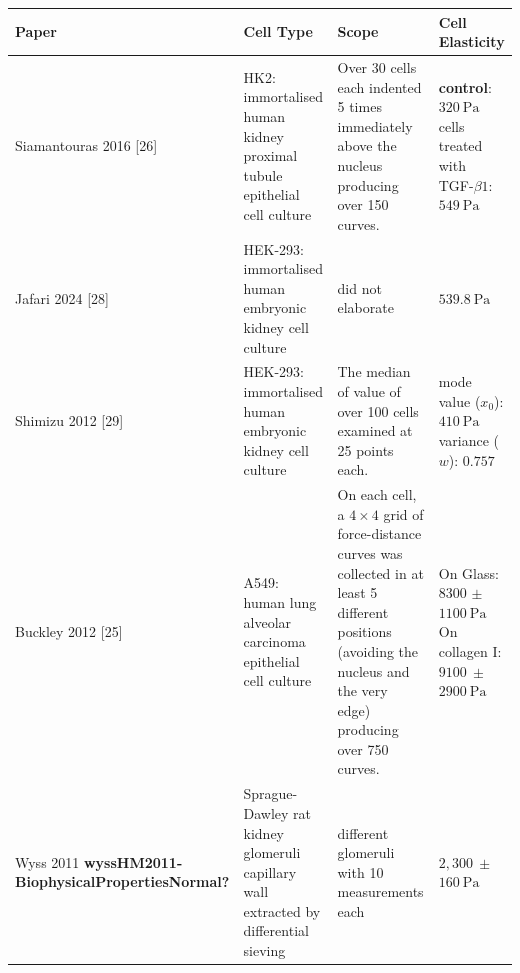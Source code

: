 \documentclass[
  paper=a4,
  ,captions=tableheading
]{scrartcl}
\begin{document}
\begin{longtable}[]{@{}
  >{\raggedright\arraybackslash}p{}
  >{\raggedright\arraybackslash}p{}
  >{\raggedright\arraybackslash}p{}
  >{\raggedright\arraybackslash}p{}@{}}
\toprule\noalign{}
\begin{minipage}[b]{\linewidth}\raggedright
Paper
\end{minipage} & \begin{minipage}[b]{\linewidth}\raggedright
Cell Type
\end{minipage} & \begin{minipage}[b]{\linewidth}\raggedright
Scope
\end{minipage} & \begin{minipage}[b]{\linewidth}\raggedright
Cell Elasticity
\end{minipage} \\
\midrule\noalign{}
\endhead
\bottomrule\noalign{}
\endlastfoot
Siamantouras 2016 {[}26{]} & HK2: immortalised human kidney proximal
tubule epithelial cell culture & Over 30 cells each indented 5 times
immediately above the nucleus producing over 150 curves. &
\textbf{control}: \(320 \ \text{Pa}\) cells treated with
TGF-\(\beta 1\): \(549 \ \text{Pa}\) \\
Jafari 2024 {[}28{]} & HEK-293: immortalised human embryonic kidney cell
culture & did not elaborate & \(539.8 \ \text{Pa}\) \\
Shimizu 2012 {[}29{]} & HEK-293: immortalised human embryonic kidney
cell culture & The median of value of over 100 cells examined at 25
points each. & mode value (\(x_{0}\)): \(410 \ \text{Pa}\) variance
(\(w\)): \(0.757\) \\
Buckley 2012 {[}25{]} & A549: human lung alveolar carcinoma epithelial
cell culture & On each cell, a \(4 \times 4\) grid of force-distance
curves was collected in at least 5 different positions (avoiding the
nucleus and the very edge) producing over 750 curves. & On Glass: 8300
\(\pm\) \(1100 \ \text{Pa}\)On collagen I: \(9100 \ \pm\)
\(2900 \ \text{Pa}\) \\
Wyss 2011 \textbf{wyssHM2011-BiophysicalPropertiesNormal?} &
Sprague-Dawley rat kidney glomeruli capillary wall extracted by
differential sieving & 10 different glomeruli with 10 measurements each
& \(2,300 \ \pm\) \(160 \ \text{Pa}\) \\
\end{longtable}
\end{document}
